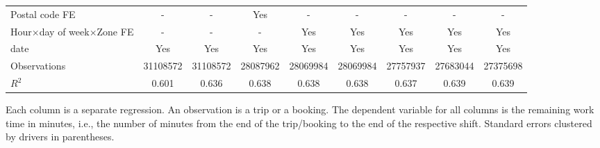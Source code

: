 \documentclass[reviewmode]{restud}
\begin{document}
\begin{landscape}
\begin{table}
{\begin{tabular}{l*{8}{S}}
            \addlinespace
            Postal code FE      &         {-}         &         {-}         &       {Yes}         &         {-}         &         {-}         &         {-}         &         {-}         &         {-}         \\
            \addlinespace
            Hour\(\times\)day of week\(\times\)Zone FE&         {-}         &         {-}         &         {-}         &       {Yes}         &       {Yes}         &       {Yes}         &       {Yes}         &       {Yes}         \\
            \addlinespace
            date                &       {Yes}         &       {Yes}         &       {Yes}         &       {Yes}         &       {Yes}         &       {Yes}         &       {Yes}         &       {Yes}         \\
            \midrule
            Observations        &\num{31108572}         &\num{31108572}         &\num{28087962}         &\num{28069984}         &\num{28069984}         &\num{27757937}         &\num{27683044}         &\num{27375698}         \\
            \(R^2\)             &     {0.601}         &     {0.636}         &     {0.638}         &     {0.638}         &     {0.638}         &     {0.637}         &     {0.639}         &     {0.639}         \\
            \bottomrule
            \end{tabular}
            }
 			\begin{tablenotes}
 				Each column is a separate regression. An observation is a trip or a booking. The dependent variable for all columns is the remaining work time in  minutes, i.e., the number of minutes from the end of the trip/booking to the end of the respective shift. Standard errors clustered by drivers in parentheses. 
 			\end{tablenotes}
 	\end{table}
 \end{landscape}
\end{document}
